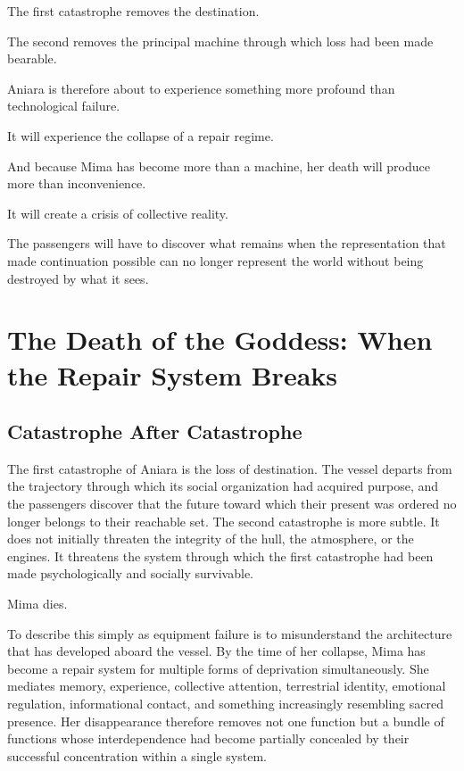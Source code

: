 \documentclass[11pt,oneside]{book}
\theoremstyle{definition}
\theoremstyle{remark}
\begin{document}
The first catastrophe removes the destination.

The second removes the principal machine through which loss had been made bearable.

Aniara is therefore about to experience something more profound than technological failure.

It will experience the collapse of a repair regime.

And because Mima has become more than a machine, her death will produce more than inconvenience.

It will create a crisis of collective reality.

The passengers will have to discover what remains when the representation that made continuation possible can no longer represent the world without being destroyed by what it sees.

\chapter{The Death of the Goddess: When the Repair System Breaks}

\section{Catastrophe After Catastrophe}

The first catastrophe of Aniara is the loss of destination. The vessel departs from the trajectory through which its social organization had acquired purpose, and the passengers discover that the future toward which their present was ordered no longer belongs to their reachable set. The second catastrophe is more subtle. It does not initially threaten the integrity of the hull, the atmosphere, or the engines. It threatens the system through which the first catastrophe had been made psychologically and socially survivable.

Mima dies.

To describe this simply as equipment failure is to misunderstand the architecture that has developed aboard the vessel. By the time of her collapse, Mima has become a repair system for multiple forms of deprivation simultaneously. She mediates memory, experience, collective attention, terrestrial identity, emotional regulation, informational contact, and something increasingly resembling sacred presence. Her disappearance therefore removes not one function but a bundle of functions whose interdependence had become partially concealed by their successful concentration within a single system.
\end{document}
